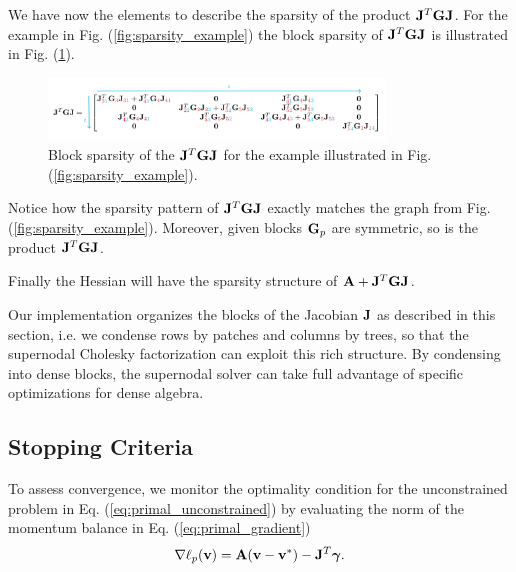 We have now the elements to describe the sparsity of the product
${\mathbf{J}}^T{\mathbf{G}}{\mathbf{J}}$. For the example in Fig.
(\ref{fig:sparsity_example}) the block sparsity of ${\mathbf{J}}^T{\mathbf{G}}{\mathbf{J}}$ is
illustrated in Fig. (\ref{fig:JTGJ_schematic}).
\begin{figure}[!h]
	\centering
	\includegraphics[width=0.8\textwidth]{figures/JTGJ_schematic.png}
	\caption{\label{fig:JTGJ_schematic} 
	Block sparsity of the ${\mathbf{J}}^T{\mathbf{G}}{\mathbf{J}}$ for the example illustrated in
	Fig. (\ref{fig:sparsity_example}).}
\end{figure}

Notice how the sparsity pattern of ${\mathbf{J}}^T{\mathbf{G}}{\mathbf{J}}$ exactly matches the
graph from Fig. (\ref{fig:sparsity_example}). Moreover, given blocks ${\mathbf{G}}_p$
are symmetric, so is the product ${\mathbf{J}}^T{\mathbf{G}}{\mathbf{J}}$.

Finally the Hessian will have the sparsity structure of ${\mathbf{A}} +
{\mathbf{J}}^T{\mathbf{G}}{\mathbf{J}}$.

Our implementation organizes the blocks of the Jacobian ${\mathbf{J}}$ as described in
this section, i.e. we condense rows by patches and columns by trees, so that the
supernodal Cholesky factorization can exploit this rich structure. By condensing
into dense blocks, the supernodal solver can take full advantage of specific
optimizations for dense algebra.



\subsection{Stopping Criteria}

To assess convergence, we monitor the optimality condition for the unconstrained
problem in Eq. (\ref{eq:primal_unconstrained}) by evaluating the norm of the
momentum balance in Eq. (\ref{eq:primal_gradient})
\begin{equation}
	\nabla\ell_p({\mathbf{v}}) = {\mathbf{A}}({\mathbf{v}}-{\mathbf{v}}^*) - {\mathbf{J}}^T{\bm\gamma}.
\end{equation}

